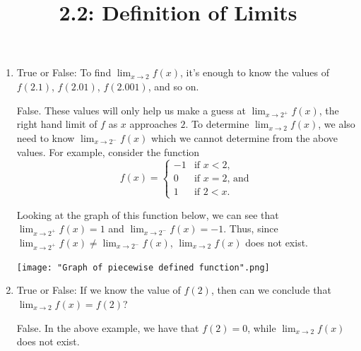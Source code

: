 \documentclass[nooutcomes]{ximera}
\title{2.2:  Definition of Limits}
\begin{document}
\begin{abstract}		\end{abstract}
\maketitle

\begin{problem} \hfil
	\begin{enumerate}

	\item  True or False: To find $\lim_{x \to 2} f(x)$, it's enough to know the values of $f(2.1)$, $f(2.01)$, $f(2.001)$, and so on.
	\begin{freeResponse}
	 False.  These values will only help us make a guess at $\lim_{x \to 2^+} f(x)$, the right hand limit of $f$ as $x$ approaches $2$.  To determine $\lim_{x \to 2} f(x)$, we also need to know $\lim_{x \to 2^-} f(x)$ which we cannot determine from the above values.  For example, consider the function
	 	        \[
          f(x) =
        \begin{cases}
         -1 & \mbox{if $x < 2$,}\\
          0 & \mbox{if $x = 2$, and}\\
          1 & \mbox{if $2 < x$.}
        \end{cases}
        \]

	Looking at the graph of this function below, we can see that $\lim_{x \to 2^+} f(x) = 1$ and $\lim_{x \to 2^-} f(x) = -1$.  Thus, since $\lim_{x \to 2^+} f(x) \neq \lim_{x \to 2^-} f(x)$, $\lim_{x \to 2} f(x)$ does not exist.
	
		\begin{image}
          \texttt{[image: "Graph of piecewise defined function".png]}
		\end{image}
	\end{freeResponse}
	
	
	
	\item  True or False: If we know the value of $f(2)$, then can we conclude that $\lim_{x \to 2} f(x)=f(2)$?
		\begin{freeResponse}
		False.  In the above example, we have that $f(2) = 0$, while $\lim_{x \to 2} f(x)$ does not exist.
		\end{freeResponse}
	\end{enumerate}


\end{problem}
\end{document}
